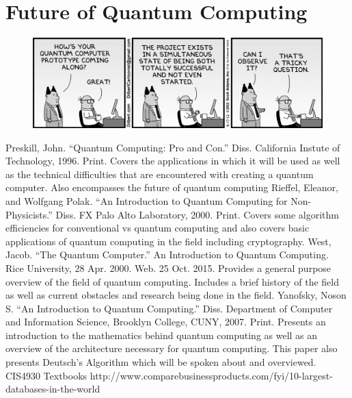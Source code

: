 \documentclass[12pt]{article}
\begin{document}
\section{Future of Quantum Computing}


\begin{figure}
\includegraphics[scale=.5]{dilbert}
\centering
\end{figure}







\newpage

\begin{thebibliography}{1}
Preskill, John. ``Quantum Computing: Pro and Con.'' Diss. California Instute of Technology, 1996. Print. Covers the applications in which it will be used as well as the technical difficulties that are encountered with creating a quantum computer. Also encompasses the future of quantum computing
Rieffel, Eleanor, and Wolfgang Polak. ``An Introduction to Quantum Computing for Non-Physicists.'' Diss. FX Palo Alto Laboratory, 2000. Print. Covers some algorithm efficiencies for conventional vs quantum computing and also covers basic applications of quantum computing in the field including cryptography.
West, Jacob. ``The Quantum Computer.'' An Introduction to Quantum Computing. Rice University, 28 Apr. 2000. Web. 25 Oct. 2015. Provides a general purpose overview of the field of quantum computing. Includes a brief history of the field as well as current obstacles and research being done in the field.
Yanofsky, Noson S. ``An Introduction to Quantum Computing.'' Diss. Department of Computer and Information Science, Brooklyn College, CUNY, 2007. Print. Presents an introduction to the mathematics behind quantum computing as well as an overview of the architecture necessary for quantum computing. This paper also presents Deutsch's Algorithm which will be spoken about and overviewed.
CIS4930 Textbooks
http://www.comparebusinessproducts.com/fyi/10-largest-databases-in-the-world
\end{thebibliography}

\clearpage
\end{document}
